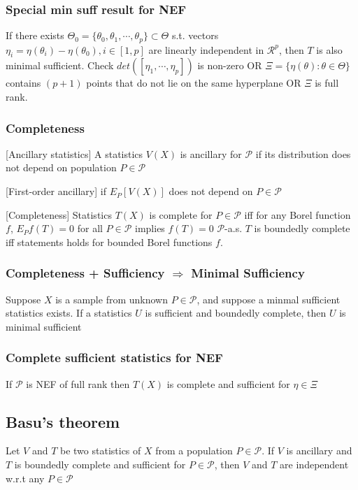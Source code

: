 \subsubsection{Special min suff result for NEF}

If there exists $\Theta_0=\{\theta_0, \theta_1, \cdots, \theta_p\}\subset \Theta$ s.t. vectors $\eta_i=\eta(\theta_i)-\eta(\theta_0), i \in [1, p]$ are linearly independent in $\mathcal{R}^p$, then $T$ is also minimal sufficient.
Check $det([\eta_1, \cdots, \eta_p])$ is non-zero OR $\Xi = \{\eta(\theta):\theta\in\Theta\}$  contains $(p+1)$ points that do not lie on the same hyperplane OR $\Xi$ is full rank.

\subsubsection{Completeness}

[Ancillary statistics]
A statistics $V(X)$ is ancillary for $\mathcal{P}$ if its distribution does not depend on population $P\in\mathcal{P}$

[First-order ancillary] if $E_P[V(X)]$ does not depend on $P\in\mathcal{P}$

[Completeness] Statistics $T(X)$ is complete for $P\in\mathcal{P}$ iff for any Borel function $f$, $E_P f(T)=0$ for all $P\in\mathcal{P}$ implies $f(T)=0$ $\mathcal{P}$-a.s.
$T$ is boundedly complete iff statements holds for bounded Borel functions $f$.

\subsubsection{Completeness + Sufficiency $\Rightarrow$ Minimal Sufficiency}

Suppose $X$ is a sample from unknown $P\in\mathcal{P}$, and suppose a minmal sufficient statistics exists.
If a statistics $U$ is sufficient and boundedly complete, then $U$ is minimal sufficient

\subsubsection{Complete sufficient statistics for NEF}

If $\mathcal{P}$ is NEF of full rank then $T(X)$ is complete and sufficient for $\eta\in\Xi$

\subsection{Basu's theorem}

Let $V$ and $T$ be two statistics of $X$ from a population $P\in\mathcal{P}$. If $V$ is ancillary and $T$ is boundedly complete and sufficient for $P\in\mathcal{P}$, then $V$ and $T$ are independent w.r.t any $P\in\mathcal{P}$ 